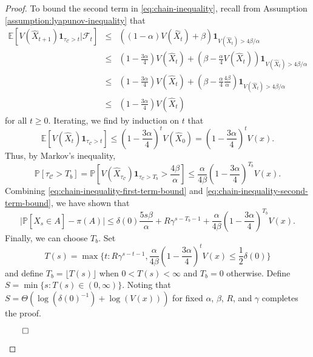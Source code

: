 \begin{proof}
To bound the second term in \eqref{eq:chain-inequality}, recall from Assumption \ref{assumption:lyapunov-inequality} that 
\begin{eqnarray*}
    \mathbb{E}[V(\hat{X}_{t+1}) \mathbf{1}_{\tau_{\mathcal{C}} > t} \vert \mathcal{F}_t] &\leq& ((1-\alpha)V(\hat{X}_t) + \beta) \mathbf{1}_{V(\hat{X}_t)>4 \beta/\alpha} \\
    &\leq& \left(1-\frac{3\alpha}{4}\right)V(\hat{X}_t) + \left(\beta - \frac{\alpha}{4} V(\hat{X}_t)\right) \mathbf{1}_{V(\hat{X}_t)>4 \beta/\alpha} \\
    &\leq& \left(1-\frac{3\alpha}{4}\right)V(\hat{X}_t) + \left(\beta - \frac{\alpha}{4} \frac{4 \beta}{\alpha}\right) \mathbf{1}_{V(\hat{X}_t)>4 \beta/\alpha} \\
    &\leq& \left(1-\frac{3\alpha}{4}\right)V(\hat{X}_t)
\end{eqnarray*}
for all $t \geq 0$. Iterating, we find by induction on $t$ that 
\begin{equation*}
    \mathbb{E}[V(\hat{X}_{t}) \mathbf{1}_{\tau_{\mathcal{C}} > t}] \leq \left(1-\frac{3\alpha}{4}\right)^{t} V(\hat{X}_0) = \left(1-\frac{3\alpha}{4}\right)^{t} V(x).   
\end{equation*}
Thus, by Markov's inequality,
\begin{equation}
    \mathbb{P}[\tau_{\mathcal{C}}>T_b] = \mathbb{P}\left[V(\hat{X}_{\tau_{\mathcal{C}}}) \mathbf{1}_{\tau_{\mathcal{C}} > T_b}>\frac{4 \beta}{\alpha} \right] \leq \frac{\alpha}{4 \beta}\left(1-\frac{3\alpha}{4}\right)^{T_b} V(x).
    \label{eq:chain-inequality-second-term-bound}
\end{equation}
Combining \eqref{eq:chain-inequality-first-term-bound} and \eqref{eq:chain-inequality-second-term-bound}, we have shown that
\begin{equation}
\vert \mathbb{P}[\hat{X}_s \in A] - \pi(A) \vert \leq \delta(0) \frac{5 s \beta}{\alpha} +  R \gamma^{s-T_b-1} + \frac{\alpha}{4 \beta}\left(1-\frac{3\alpha}{4}\right)^{T_b} V(x).
\end{equation}
Finally, we can choose $T_b$. Set 
\begin{equation*}
    T(s) = \max{\{t : R \gamma^{s-t-1}, \frac{\alpha}{4\beta}\left(1-\frac{3\alpha}{4}\right)^{t} V(x) \leq \frac{1}{2}\delta(0)\}}    
\end{equation*}
and define $T_b = \lfloor T(s) \rfloor$ when $0 < T(s) < \infty$ and $T_b = 0$ otherwise. Define $S=\min{\{s : T(s) \in (0, \infty)\}}$. Noting that $S = \Theta(\log{(\delta(0)^{-1})}+\log{(V(x))})$ for fixed $\alpha$, $\beta$, $R$, and $\gamma$ completes the proof.
\begin{flushright}$\qed$\end{flushright}
\end{proof}

